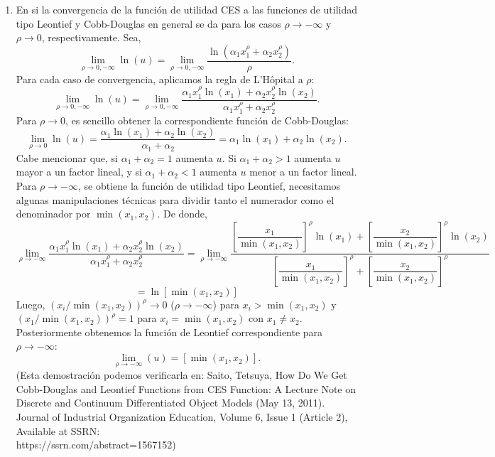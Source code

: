 \begin{enumerate}
\begin{enumerate}[\bfseries a)]
\begin{enumerate}[e1)]
		\item En si la convergencia de la función de utilidad CES a las funciones de utilidad tipo Leontief y Cobb-Douglas en general se da para los casos $\rho\to -\infty$ y $\rho\to 0$, respectivamente. Sea,
		$$\lim_{\rho\to 0,-\infty} \ln (u) = \lim_{\rho\to 0,-\infty} \dfrac{\ln(\alpha_1 x_1^{\rho}+\alpha_2 x_2^{\rho})}{\rho}.$$
		Para cada caso de convergencia, aplicamos la regla de L'Hôpital a $\rho$:
		$$\lim_{\rho\to 0,-\infty} \ln (u) = \lim_{\rho\to 0,-\infty} \dfrac{\alpha_1x_1^\rho\ln(x_1)+\alpha_2x_2^\rho\ln(x_2)}{\alpha_1x_1^\rho+\alpha_2x_2^\rho}.$$
		Para $\rho\to 0$, es sencillo obtener la correspondiente función de Cobb-Douglas:
		$$\lim_{\rho\to 0} \ln (u) = \dfrac{\alpha_1\ln(x_1)+\alpha_2\ln(x_2)}{\alpha_1+\alpha_2} = \alpha_1\ln(x_1)+\alpha_2\ln(x_2).$$
		Cabe mencionar que, si $\alpha_1+\alpha_2=1$ aumenta $u$. Si $\alpha_1+\alpha_2>1$ aumenta $u$ mayor a un factor lineal, y si $\alpha_1+\alpha_2<1$ aumenta $u$ menor a un factor lineal.\\

		Para $\rho\to -\infty$, se obtiene la función de utilidad tipo Leontief, necesitamos algunas manipulaciones técnicas para dividir tanto el numerador como el denominador por $\min\left(x_1,x_2\right)$. De donde,
		$$\displaystyle\lim_{\rho\to -\infty} \dfrac{\alpha_1x_1^\rho\ln(x_1)+\alpha_2x_2^\rho\ln(x_2)}{\alpha_1x_1^\rho+\alpha_2x_2^\rho} = \displaystyle\lim_{\rho\to -\infty} \dfrac{\left[\dfrac{x_1}{\min\left(x_1,x_2\right)}\right]^\rho \ln(x_1)+\left[\dfrac{x_2}{\min\left(x_1,x_2\right)}\right]^\rho \ln(x_2)}{\left[\dfrac{x_1}{\min\left(x_1,x_2\right)}\right]^\rho+\left[\dfrac{x_2}{\min\left(x_1,x_2\right)}\right]^\rho}$$
		$$=\ln\left[\min(x_1,x_2)\right]$$
		Luego, $(x_i/\min(x_1,x_2))^\rho\to 0$ ($\rho\to -\infty$) para $x_i>\min(x_1,x_2)$ y $(x_1/\min(x_1,x_2))^\rho = 1$ para $x_i=\min(x_1,x_2)$ con $x_1\neq x_2$. Posteriormente obtenemos la función de Leontief correspondiente para $\rho\to -\infty$:
		$$\lim_{\rho\to -\infty} (u) =\left[\min(x_1,x_2)\right].$$
		(Esta demostración podemos verificarla en: Saito, Tetsuya, How Do We Get Cobb-Douglas and Leontief Functions from CES Function: A Lecture Note on Discrete and Continuum Differentiated Object Models (May 13, 2011). Journal of Industrial Organization Education, Volume 6, Issue 1 (Article 2), Available at SSRN: \\ https://ssrn.com/abstract=1567152)\\\\

	    \end{enumerate}


\end{enumerate}
\end{enumerate}

